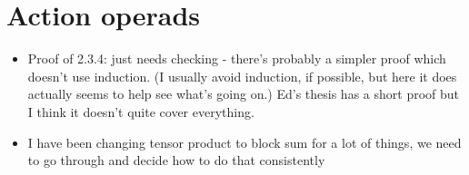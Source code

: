 \documentclass{amsart}
\begin{document}
\section{Action operads}
\begin{itemize}
\item Proof of 2.3.4: just needs checking - there's probably a simpler proof which doesn't use induction. (I usually avoid induction, if possible, but here it does actually seems to help see what's going on.) Ed's thesis has a short proof but I think it doesn't quite cover everything.
\item I have been changing tensor product to block sum for a lot of things, we need to go through and decide how to do that consistently

\end{itemize}
\end{document}
